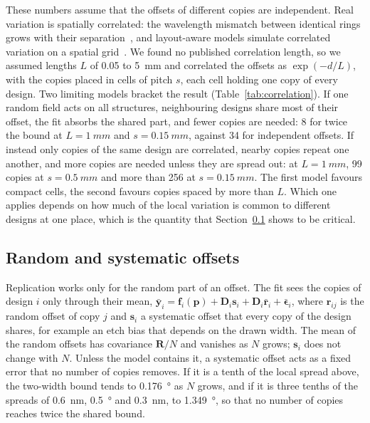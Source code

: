 These numbers assume that the offsets of different copies are independent. Real variation is spatially correlated: the wavelength mismatch between
identical rings grows with their separation~\cite{chrostowski2014}, and layout-aware models simulate correlated variation on a spatial
grid~\cite{lu2017}. We found no published correlation length, so we assumed lengths $L$ of 0.05 to \qty{5}{mm} and correlated the offsets as
$\exp(-d/L)$, with the copies placed in cells of pitch $s$, each cell holding one copy of every design. Two limiting models bracket the
result (Table~\ref{tab:correlation}). If one random field acts on all structures, neighbouring designs share most of their offset, the fit
absorbs the shared part, and fewer copies are needed: 8 for twice the bound at $L=\qty{1}{mm}$ and $s=\qty{0.15}{mm}$, against 34 for
independent offsets. If instead only copies of the same design are correlated, nearby copies repeat one another, and more copies are
needed unless they are spread out: at $L=\qty{1}{mm}$, 99 copies at $s=\qty{0.5}{mm}$ and more than 256 at $s=\qty{0.15}{mm}$. The
first model favours compact cells, the second favours copies spaced by more than $L$. Which one applies depends on how much of the local
variation is common to different designs at one place, which is the quantity that Section~\ref{sec:systematic} shows to be critical.

\subsection{Random and systematic offsets}
\label{sec:systematic}

Replication works only for the random part of an offset. The fit sees the copies of design $i$ only through their mean,
$\bar{\mathbf{y}}_i=\mathbf{f}_i(\mathbf{p})+\mathbf{D}_i\mathbf{s}_i+\mathbf{D}_i\bar{\mathbf{r}}_i+\bar{\boldsymbol{\epsilon}}_i$, where
$\mathbf{r}_{ij}$ is the random offset of copy $j$ and $\mathbf{s}_i$ a systematic offset that every copy of the design shares, for example an
etch bias that depends on the drawn width. The mean of the random offsets has covariance $\mathbf{R}/N$ and vanishes as $N$ grows; $\mathbf{s}_i$
does not change with $N$. Unless the model contains it, a systematic offset acts as a fixed error that no number of copies removes. If it is a
tenth of the local spread above, the two-width bound tends to \qty{0.176}{\degree} as $N$ grows, and if it is three tenths of the spreads of
\qty{0.6}{nm}, \qty{0.5}{\degree} and \qty{0.3}{nm}, to \qty{1.349}{\degree}, so that no number of copies reaches twice the shared bound.

